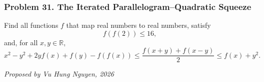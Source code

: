 \subsubsection*{Problem 31. The Iterated Parallelogram--Quadratic Squeeze}

\begin{exercisebox}[hard]

Find all functions $f$ that map real numbers to real numbers, satisfy
\[
f(f(2))\leq16,
\]
and, for all $x,y\in\mathbb R$,
\[
 x^2-y^2+2yf(x)+f(y)-f(f(x))
 \leq\frac{f(x+y)+f(x-y)}{2}
 \leq f(x)+y^2.
\]

\begin{flushright}
\textit{Proposed by Vu Hung Nguyen, 2026}
\end{flushright}


\end{exercisebox}